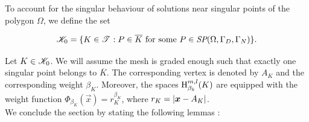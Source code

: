 \documentclass[a4paper,11pt]{article}
\newtheorem{lemma}[theorem]{Lemma}
\begin{document}
To account for the singular behaviour of solutions near singular points of the polygon $\Omega$, we define the set

\begin{equation}
    \mathscr K_{0} = \{ K \in \mathscr T^{} : P \in \overline{K} \text{ for some } P \in \textit{SP}(\Omega,\Gamma_{D},\Gamma_{N}) \}.
\end{equation}

Let $K \in \mathscr K_{0}$. We will assume the mesh is graded enough such that exactly one singular point belongs to $\overline{K}$. The corresponding vertex is denoted by $A_{K}$ and the corresponding weight $\beta_{K}$. Moreover, the spaces $\operatorname H^{m,l}_{\beta_{k}}(K)$ are equipped with the weight function $\Phi_{\beta_{K}}(\vec{x}) = r_{K}^{\beta_{K}}$, where $r_{K} = \left|\boldsymbol x - A_{K}\right|$.
\\
We conclude the section by stating the following lemmas \cite{Wihler:2003}:

\end{document}
